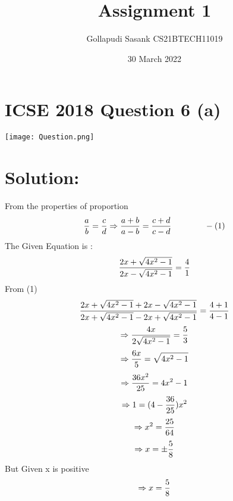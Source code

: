 \documentclass[twocolumn]{article}
\title{Assignment 1}
\author{Gollapudi Sasank CS21BTECH11019}
\date{30 March 2022}
\begin{document}
\maketitle
\section*{ICSE 2018 Question 6 (a)}
\texttt{[image: Question.png]}
\section*{Solution:}
From the properties of proportion \\ 
\begin{equation*}
     \frac{a}{b}  =  \frac{c}{d} 
     \Rightarrow 
     \frac{a+b}{a-b} = \frac{c+d}{c-d} \hspace{40pt} -(1) \\
\end{equation*}
The Given Equation is :
    \begin{equation*}
    \centering
        \frac{2x+\sqrt{4x^2-1}}{2x-\sqrt{4x^2-1}} = \frac {4}{1}
    \end{equation*}
    From (1) 
\begin{equation*}
        \frac {2x+\sqrt{4x^2-1}+2x-\sqrt{4x^2-1}}{2x+\sqrt{4x^2-1}-2x+\sqrt{4x^2-1}} = \frac {4+1}{4-1} \\
\end{equation*}
\begin{equation*}
        \Rightarrow
        \frac{4x}{2\sqrt{4x^2-1}} = \frac {5}{3} \\
\end{equation*}
\begin{equation*}
        \Rightarrow
        \frac{6x}{5} = \sqrt{4x^2-1} \\
\end{equation*}
\begin{equation*}
    \Rightarrow
        \frac{36x^2}{25} = 4x^2-1 \\
\end{equation*}
\begin{equation*}
        \Rightarrow
        1 = (4 - \frac{36}{25} )  x^2 \\
\end{equation*}
\begin{equation*}
    \Rightarrow
    x^2 =\frac{25}{64} \\ \\ \\ 
\end{equation*}
\begin{equation*}
    \Rightarrow
    x = \pm\frac{5}{8} \\
\end{equation*}
But Given x is positive 
\begin{equation*}
  \Rightarrow x = \frac{5}{8} \\  
\end{equation*}
\end{document}
